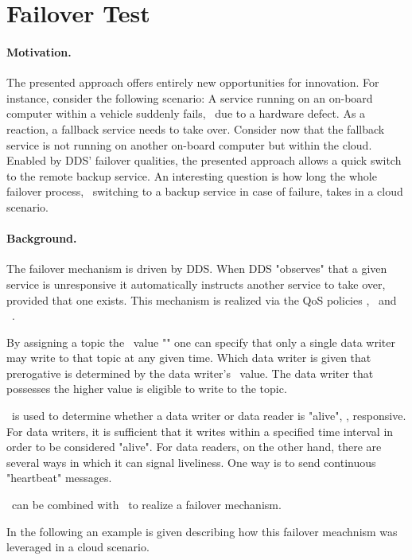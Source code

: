 %
%
%
%
%
%
%
%
%
%

\section{Failover Test}

\paragraph{Motivation.} The presented approach offers entirely new opportunities for innovation. For instance, consider the following scenario: A service running on an on-board computer within a vehicle suddenly fails, \eg\ due to a hardware defect. As a reaction, a fallback service needs to take over. Consider now that the fallback service is not running on another on-board computer but within the cloud. Enabled by DDS' failover qualities, the presented approach allows a quick switch to the remote backup service. An interesting question is how long the whole failover process, \ie\ switching to a backup service in case of failure, takes in a cloud scenario.

\paragraph{Background.} The failover mechanism is driven by DDS. When DDS "observes" that a given service is unresponsive it automatically instructs another service to take over, provided that one exists. This mechanism is realized via the QoS policies \ownership , \ostrength\ and \liveliness\ . 

By assigning a topic the \ownership\ value "" one can specify that only a single data writer may write to that topic at any given time. Which data writer is given that prerogative is determined by the data writer's \ostrength\ value. The data writer that possesses the higher value is eligible to write to the topic.

\liveliness\ is used to determine whether a data writer or data reader is "alive", \ie , responsive. For data writers, it is sufficient that it writes within a specified time interval in order to be considered "alive". For data readers, on the other hand, there are several ways in which it can signal liveliness. One way is to send continuous "heartbeat" messages.

\ownership\ can be combined with \liveliness\ to realize a failover mechanism.

In the following an example is given describing how this failover meachnism was leveraged in a cloud scenario.


